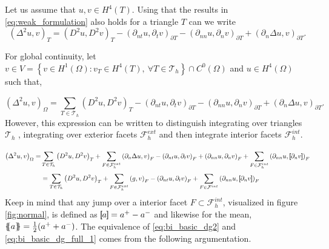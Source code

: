  Let us assume that $u,v \in
H^{4}\left( T  \right) $. Using that the results in \eqref{eq:weak_formulation} also holds for a triangle $T$ can we write
\begin{equation}
\label{eq:bi_basic_dg}
\left( \Delta  ^{2} u,v \right) _{T} =  \left( D^2u,D^2v \right) _{T } - \left(\partial _{nt} u, \partial _{t}v
\right)_{\partial T} - \left(\partial _{nn} u, \partial _{n}v \right)_{\partial T} + \left(\partial _{n} \Delta  u,v
\right)_{\partial T}
.\end{equation}

For global continuity, let  $v \in V =  \left\{ v \in H^{1}\left( \Omega  \right): v_{T} \in  H^{4}\left( T \right), \ \forall T \in
\mathcal{T}_{h}    \right\}   \cap C^{0} (
\Omega  ) $ and $u \in  H^{4}\left( \Omega  \right) $ such that,

\begin{equation}
\label{eq:bi_basic_dg2}
\left( \Delta  ^{2} u,v \right) _{\Omega } = \sum_{T \in  \mathcal{T} _{h}}^{}  \left( D^2u,D^2v \right) _{T } - \left(\partial _{nt} u, \partial _{t}v
\right)_{\partial T} - \left(\partial _{nn} u, \partial _{n}v \right)_{\partial T} + \left(\partial _{n} \Delta  u,v
\right)_{\partial T}.
\end{equation}
However, this expression can be written to distinguish integrating over triangles $\mathcal{T} _{h}$ , integrating over exterior facets $\mathcal{F} _{h}^{ext}$ and then integrate interior facets $\mathcal{F} _{h}^{int}$.

\begin{equation}
\label{eq:bi_basic_dg_full_1}
\begin{split}
\left( \Delta  ^{2} u, v \right) _{\Omega } =& \sum_{T \in  \mathcal{T} _{h}}^{} \left( D^2u, D^2v \right)_{T}  + \sum_{F \in \mathcal{F}_{h}^{ext}}  \left(\partial _{n} \Delta u, v  \right) _{F}
- \left(\partial _{nt} u, \partial _{t} v \right) _{F}+
\left( \partial _{nn} u, \partial _{n} v \right)_{F} + \sum_{F \in \mathcal{F}_{h}  ^{int}}^{} \left(\partial _{nn} u , \jump{ \partial _{n} v }
\right)_{F} \\
& = \sum_{T \in  \mathcal{T} _{h}}^{} \left( D^2u, D^2v \right)_{T} + \sum_{F \in
\mathcal{F} ^{ext}_{h}}^{} \left(g, v  \right) _{F}
- \left(\partial_{nt} u , \partial _{t} v \right)_{F}  + \sum_{F \in \mathcal{F}  ^{int}}^{} \left( \partial _{nn} u , \jump{ \partial_{n} v } \right)_{F}
\end{split}
\end{equation}
Keep in mind that any jump over a interior facet $F \subset \mathcal{F} _{h}^{int}   $, visualized in figure \ref{fig:normal}, is defined as $\left[\!\!\left[  a  \right]\!\!\right] =    a^{+} - a^{-} $
and likewise for the mean, $\left\{\!\!\left\{ a  \right\}\!\!\right\} = \frac{1}{2}(   a^{+}
+ a^{-})$.    The equivalence of \eqref{eq:bi_basic_dg2} and \eqref{eq:bi_basic_dg_full_1} comes from the following argumentation.

